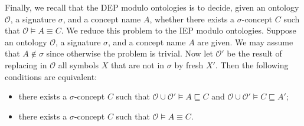 \documentclass{lmcs} %
\theoremstyle{plain}\newtheorem{satz}[thm]{Satz} %
\newcommand{\bs}{\boldsymbol{\beta}}
\begin{document}
\begin{appendix}
Finally, we recall that the DEP modulo ontologies is to decide, given an ontology $\mathcal{O}$, a signature $\sigma$, and a concept name $A$, whether there exists a $\sigma$-concept $C$ such that $\mathcal{O}\models A \equiv C$. We reduce this problem to the IEP modulo ontologies.
Suppose an ontology $\mathcal{O}$, a signature $\sigma$, and a concept name $A$
are given. We may assume that $A\not\in\sigma$ since otherwise the problem is trivial.
Now let $\mathcal{O}'$ be the result of replacing in  $\mathcal{O}$ all symbols
$X$ that are not in $\sigma$ by fresh $X'$. Then the following conditions are equivalent:
%
\begin{itemize}
	\item[--] there exists a $\sigma$-concept $C$ such that $\mathcal{O}\cup \mathcal{O}'\models A \sqsubseteq C$ and $\mathcal{O}\cup \mathcal{O}'\models C \sqsubseteq A'$; 
	
	\item[--] there exists a $\sigma$-concept $C$ such that $\mathcal{O}\models A \equiv C$.
\end{itemize}



\end{appendix}
\end{document}
